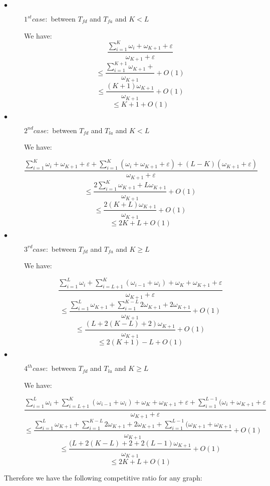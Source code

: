 \documentclass[a4paper, 10pt]{article}
\begin{document}
\begin{description}
\item[$\bullet$] $1^{st} case:$ between $T_{fd}$ and $T_{fa}$ and $K<L$

We have: 
\[
\frac {\sum_{i=1}^{K} \omega_{i} + \omega_{K+1} + \varepsilon} {\omega_{K+1} + \varepsilon} 
\]
\[
\leq \frac {\sum_{i=1}^{K+1} \omega_{K+1} +} {\omega_{K+1}} + O(1) 
\]
\[
\leq \frac {(K+1)\omega_{K+1} } {\omega_{K+1}} + O(1)
\]
\[
\leq K+1 + O(1)
\]

\item[$\bullet$] $2^{nd} case:$ between $T_{fd}$ and $T_{la}$ and $K<L$

We have:

\[
\frac {\sum_{i=1}^{K} \omega_{i} + \omega_{K+1} + \varepsilon + \sum_{i=1}^{K}(\omega_{i} + \omega_{K+1} + \varepsilon) + (L - K) ( \omega_{K+1} + \varepsilon )}{\omega_{K+1} + \varepsilon} 
\]
\[
 \leq \frac {2\sum_{i=1}^{K} \omega_{K+1} + L\omega_{K+1}}{\omega_{K+1}} + O(1)
\]
\[
 \leq \frac {2(K+L)\omega_{K+1}}{\omega_{K+1}} + O(1)
\]
\[
 \leq 2K+ L + O(1)
\]

\item[$\bullet$] $3^{rd} case:$ between $T_{fd}$ and $T_{fa}$ and $K \geq L$

We have: 

\[
\frac {\sum_{i=1}^{L} \omega_{i} + \sum_{i=L+1}^{K}(\omega_{i-1} + \omega_{i} ) + \omega_{K} + \omega_{K+1} + \varepsilon} {\omega_{K+1} + \varepsilon} 
\]
\[
\leq \frac {\sum_{i=1}^{L} \omega_{K+1} + \sum_{i=1}^{K-L}2\omega_{K+1} + 2\omega_{K+1}}{\omega_{K+1}} + O(1)
\]
\[
\leq \frac {(L + 2(K - L) + 2)\omega_{K+1}}{\omega_{K+1}} + O(1)
\]
\[
\leq 2(K + 1 ) - L + O(1)
\]

\item[$\bullet$] $4^{th} case:$ between $T_{fd}$ and $T_{la}$ and $K \geq L$

We have:

\[
\frac {\sum_{i=1}^{L} \omega_{i} + \sum_{i=L+1}^{K}(\omega_{i-1} + \omega_{i} ) + \omega_{K} + \omega_{K+1} + \varepsilon + \sum_{i=1}^{L-1}(\omega_{i} + \omega_{K+1} + \varepsilon } {\omega_{K+1} + \varepsilon} 
\]
\[
\leq \frac {\sum_{i=1}^{L} \omega_{K+1} + \sum_{i=1}^{K-L}2\omega_{K+1} + 2\omega_{K+1} + \sum_{i=1}^{L-1}(\omega_{K+1} + \omega_{K+1}} {\omega_{K+1}} + O(1)
\]
\[
\leq \frac {(L + 2(K - L) + 2 + 2(L-1)\omega_{K+1}}{\omega_{K+1}} + O(1)
\]
\[
 \leq 2K + L + O(1)
\]

\end{description}


Therefore we have the following competitive ratio for any graph:
\end{document}
